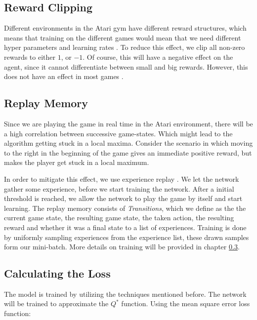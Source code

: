 \documentclass{article}
\begin{document}
\subsection{Reward Clipping}

Different environments in the Atari gym have different reward structures, which means that training on the different games would mean that we need different hyper parameters and learning rates . To reduce this effect, we clip all non-zero rewards to either $1$, or $-1$. Of course, this will have a negative effect on the agent, since it cannot differentiate between small and big rewards. However, this does not have an effect in most games \cite{mnih2015human}.


\subsection{Replay Memory}
Since we are playing the game in real time in the Atari environment, there will be a high correlation between successive game-states. Which might lead to the algorithm getting stuck in a local maxima. Consider the scenario in which moving to the right in the beginning of the game gives an immediate positive reward, but makes the player get stuck in a local maximum.

In order to mitigate this effect, we use experience replay \cite{mnih2013playing}. We let the network gather some experience, before we start training the network. After a initial threshold is reached, we allow the network to play the game by itself and start learning. The replay memory consists of \textit{Transitions}, which we define as the the current game state, the resulting game state, the taken action, the resulting reward and whether it was a final state to a list of experiences. Training is done by uniformly sampling experiences from the experience list, these drawn samples form our mini-batch. More details on training will be provided in chapter \ref{chapter:training}.

\subsection{Calculating the Loss} \label{chapter:training}

The model is trained by utilizing the techniques mentioned before. The network will be trained to approximate the $Q^*$ function. Using the mean square error loss function:
\end{document}
